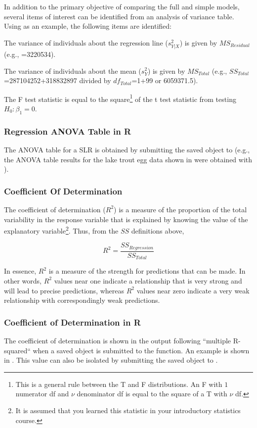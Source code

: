 \documentclass[10pt,openany]{book}\usepackage[]{graphicx}\usepackage[]{color}
\begin{document}
In addition to the primary objective of comparing the full and simple models, several items of interest can be identified from an analysis of variance table.  Using  as an example, the following items are identified:
\begin{Itemize}
  \item The variance of individuals about the regression line ($s_{Y|X}^{2}$) is given by $MS_{Residual}$ (e.g., =3220534).
  \item The variance of individuals about the mean ($s_{Y}^{2}$) is given by $MS_{Total}$ (e.g., $SS_{Total}$=287104252+318832897 divided by $df_{Total}$=1+99 or 6059371.5).
  \item The F test statistic is equal to the square\footnote{This is a general rule between the T and F distributions.  An F with $1$ numerator df and $\nu$ denominator df is equal to the square of a T with $\nu$ df.} of the t test statistic from testing $H_{0}:\beta_{1}=0$.
\end{Itemize}

\subsubsection*{Regression ANOVA Table in R}
The ANOVA table for a SLR is obtained by submitting the saved  object to  (e.g., the ANOVA table results for the lake trout egg data shown in  were obtained with ).

\subsubsection{Coefficient Of Determination}
The coefficient of determination ($R^{2}$) is a measure of the proportion of the total variability in the response variable that is explained by knowing the value of the explanatory variable\footnote{It is assumed that you learned this statistic in your introductory statistics course.}.  Thus, from the $SS$ definitions above,

\[ R^{2} = \frac{SS_{Regression}}{SS_{Total}} \]

In essence, $R^{2}$ is a measure of the strength for predictions that can be made.  In other words, $R^{2}$ values near one indicate a relationship that is very strong and will lead to precise predictions, whereas $R^{2}$ values near zero indicate a very weak relationship with correspondingly weak predictions.

\subsubsection*{Coefficient of Determination in R}
The coefficient of determination is shown in the output following ``multiple R-squared`` when a saved  object is submitted to the  function.  An example is shown in .  This value can also be isolated by submitting the saved  object to .
\end{document}
